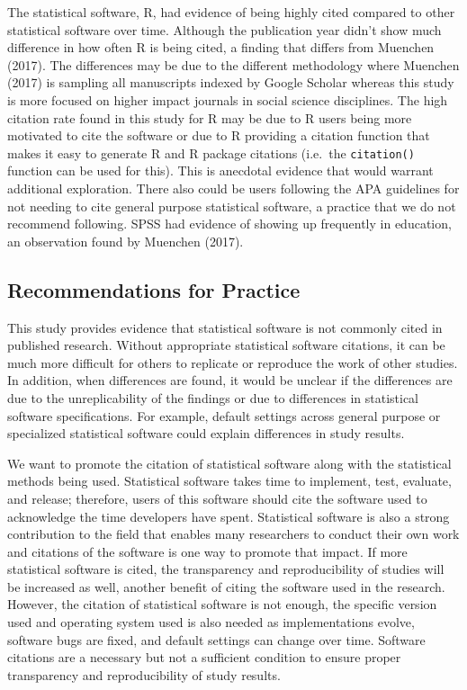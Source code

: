 \documentclass[
  english,
  ,man]{apa7}
\begin{document}
The statistical software, R, had evidence of being highly cited compared to other statistical software over time. Although the publication year didn't show much difference in how often R is being cited, a finding that differs from Muenchen (2017). The differences may be due to the different methodology where Muenchen (2017) is sampling all manuscripts indexed by Google Scholar whereas this study is more focused on higher impact journals in social science disciplines. The high citation rate found in this study for R may be due to R users being more motivated to cite the software or due to R providing a citation function that makes it easy to generate R and R package citations (i.e.~the \texttt{citation()} function can be used for this). This is anecdotal evidence that would warrant additional exploration. There also could be users following the APA guidelines for not needing to cite general purpose statistical software, a practice that we do not recommend following. SPSS had evidence of showing up frequently in education, an observation found by Muenchen (2017).

\hypertarget{recommendations-for-practice}{%
\subsection{Recommendations for Practice}\label{recommendations-for-practice}}

This study provides evidence that statistical software is not commonly cited in published research. Without appropriate statistical software citations, it can be much more difficult for others to replicate or reproduce the work of other studies. In addition, when differences are found, it would be unclear if the differences are due to the unreplicability of the findings or due to differences in statistical software specifications. For example, default settings across general purpose or specialized statistical software could explain differences in study results.

We want to promote the citation of statistical software along with the statistical methods being used. Statistical software takes time to implement, test, evaluate, and release; therefore, users of this software should cite the software used to acknowledge the time developers have spent. Statistical software is also a strong contribution to the field that enables many researchers to conduct their own work and citations of the software is one way to promote that impact. If more statistical software is cited, the transparency and reproducibility of studies will be increased as well, another benefit of citing the software used in the research. However, the citation of statistical software is not enough, the specific version used and operating system used is also needed as implementations evolve, software bugs are fixed, and default settings can change over time. Software citations are a necessary but not a sufficient condition to ensure proper transparency and reproducibility of study results.
\end{document}
